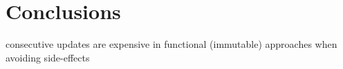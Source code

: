 \section{Conclusions}

consecutive updates are expensive in functional (immutable) approaches when avoiding side-effects